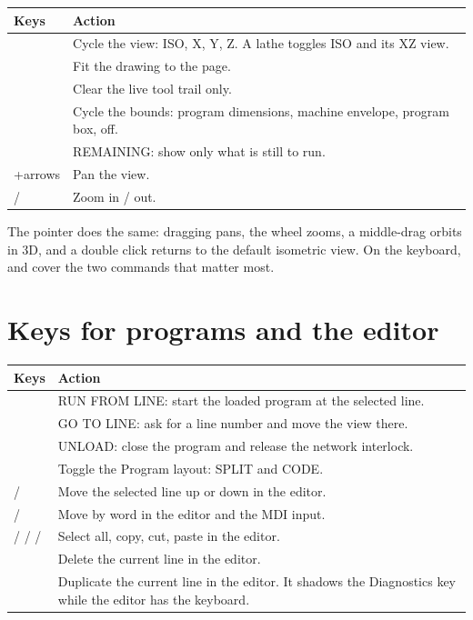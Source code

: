 \begin{longtable}{L{4.7cm}L{8.1cm}}
  \toprule
  \textbf{Keys} & \textbf{Action} \\
  \midrule
  \endhead
   & Cycle the view: ISO, X, Y, Z. A lathe toggles ISO and its XZ
        view. \\
   & Fit the drawing to the page. \\
   & Clear the live tool trail only. \\
   & Cycle the bounds: program dimensions, machine envelope, program
        box, off. \\
   & REMAINING: show only what is still to run. \\
  +arrows & Pan the view. \\
   /  & Zoom in / out. \\
  \bottomrule
\end{longtable}

The pointer does the same: dragging pans, the wheel zooms, a middle-drag orbits in 3D, and a
double click returns to the default isometric view. On the keyboard, 
and  cover the two commands that matter most.

\section{Keys for programs and the editor}

\begin{longtable}{L{4.7cm}L{8.1cm}}
  \toprule
  \textbf{Keys} & \textbf{Action} \\
  \midrule
  \endhead
   & RUN FROM LINE: start the loaded program at the selected line. \\
   & GO TO LINE: ask for a line number and move the view there. \\
   & UNLOAD: close the program and release the network interlock. \\
   & Toggle the Program layout: SPLIT and CODE. \\
   /  & Move the selected line up or down in
        the editor. \\
   /  & Move by word in the editor and the
        MDI input. \\
   /  /  /  & Select all, copy, cut,
        paste in the editor. \\
   & Delete the current line in the editor. \\
   & Duplicate the current line in the editor. It shadows the
        Diagnostics key while the editor has the keyboard. \\
  \bottomrule
\end{longtable}


